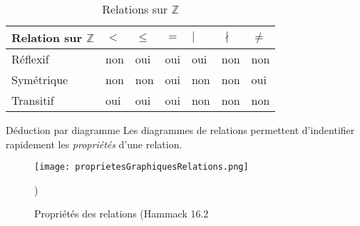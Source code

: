 \documentclass[16pt]{report}
\begin{document}
\begin{multicols*}{2}
           \begin{table}[H]

             \begin{center}
               \renewcommand{\arraystretch}{1.5}
               \selectfont
               \footnotesize
                   \begin{tabular}{|l|l l l l l l|}
                   \arrayrulecolor{blue}\hline
                   \rowcolor{lightBlue}
                   \textcolor{myb}{Relation sur $\mathbb{Z}$ } & \textcolor{myb}{$<$}
                                                    & \textcolor{myb}{$ \leq $} 
                                                    & \textcolor{myb}{$ = $} 
                                                    & \textcolor{myb}{$|$} 
                                                    & \textcolor{myb}{$\nmid$} 
                                                    & \textcolor{myb}{$\neq$}  
                   \\
                   \hline
                   \hline
                   \arrayrulecolor{black}
                   Réflexif & non & oui & oui & oui & non & non  
                   \\
                   \hline
                   Symétrique & non & non & oui & non & non & oui                    
                   \\
                   \hline
                   Transitif & oui & oui & oui & non & non & non                  
                   \\ 
                   \hline
                   \end{tabular}
           \end{center}
                \caption {Relations sur $\mathbb{Z}$ }
           \end{table}


           \begin{Remarque}{Déduction par diagramme}{}
               Les diagrammes de relations permettent d'indentifier rapidement les 
               \textit{propriétés} d'une relation.  
           \end{Remarque}


           \begin{figure}[H]
            \begin{center}
                \texttt{[image: proprietesGraphiquesRelations.png]}
            \end{center}
            \caption{Propriétés des relations (Hammack 16.2})
           \end{figure}



\end{multicols*}
\end{document}
